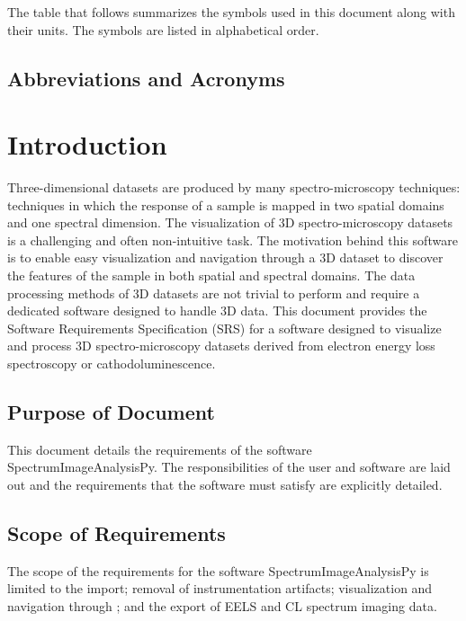 \documentclass[12pt]{article}
\newcommand{\progname}{SpectrumImageAnalysisPy} %
\begin{document}
The table that follows summarizes the symbols used in this document along with
their units. The symbols are listed in alphabetical order.



\subsection{Abbreviations and Acronyms}



\newpage
{}

\section{Introduction}
Three-dimensional datasets are produced by many spectro-microscopy techniques:
techniques in which the response of a sample is mapped in two spatial domains
and one spectral dimension. The visualization of 3D spectro-microscopy datasets
is a challenging and often non-intuitive task. The motivation behind this
software is to enable easy visualization and navigation through a 3D dataset to
discover the features of the sample in both spatial and spectral domains. The
data processing methods of 3D datasets are not trivial to perform and require a
dedicated software designed to handle 3D data. This document provides the
Software Requirements Specification (SRS) for a software designed to visualize
and process 3D spectro-microscopy datasets derived from electron energy loss
spectroscopy or cathodoluminescence.

\subsection{Purpose of Document}

This document details the requirements of the software \progname{}. The
responsibilities of the user and software are laid out and the requirements that
the software must satisfy are explicitly detailed.

\subsection{Scope of Requirements} 
The scope of the requirements for the software \progname{} is limited to the
import; removal of instrumentation artifacts; visualization and navigation
through ; and the export of EELS and CL spectrum imaging data.
\end{document}
